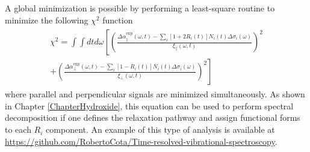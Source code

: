 A global minimization is possible by performing a least-square routine to minimize the following $\chi^2$ function
\begin{eqnarray}
\begin{split}
\chi^2 = \int \int   dt d\omega \left[    \left( \frac{\Delta \alpha_\parallel^\text{exp} (\omega,t) - \sum_i [1 + 2 R_i(t)]N_i(t) \Delta\sigma_i(\omega)}{\xi_\parallel (\omega, t)}\right)^2 \right. \\ \left. +     \left( \frac{\Delta \alpha_\perp^\text{exp} (\omega,t) - \sum_i [1 - R_i(t)]N_i(t) \Delta\sigma_i(\omega)}{\xi_\perp (\omega, t)}\right)^2  \right]  
\label{ChiSquareGlobal}
\end{split}
\end{eqnarray}
where parallel and perpendicular signals are minimized simultaneously. As shown in Chapter \ref{ChapterHydroxide}, this equation can be used to perform spectral decomposition if one defines the relaxation pathway and assign functional forms to each $R_i$ component. An example of this type of analysis is available at \href{https://github.com/RobertoCota/Time-resolved-vibrational-spectroscopy}{https://github.com/RobertoCota/Time-resolved-vibrational-spectroscopy}.


\bigskip
\bigskip




